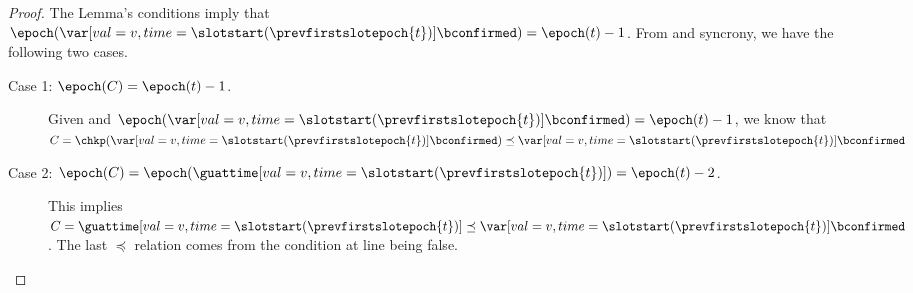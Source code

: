 \documentclass{article}
\begin{document}
\begin{proof}
    The Lemma's conditions imply that $\epoch(\var[val=v,time=\slotstart(\prevfirstslotepoch{t})]{\bconfirmed}) = \epoch(t)-1$.
    From  and syncrony, we have the following two cases.
    \begin{description}
        \item[Case 1: {$\epoch(C)=\epoch(t)-1$}.] 
        Given  and $\epoch(\var[val=v,time=\slotstart(\prevfirstslotepoch{t})]{\bconfirmed}) = \epoch(t)-1$, we know that $C  = \chkp(\var[val=v,time=\slotstart(\prevfirstslotepoch{t})]{\bconfirmed}) \preceq \var[val=v,time=\slotstart(\prevfirstslotepoch{t})]{\bconfirmed}$
        \item[Case 2: {$\epoch(C)=\epoch(\guattime[val=v,time=\slotstart(\prevfirstslotepoch{t})] )=\epoch(t)-2$}.]
        This implies $C = \guattime[val=v,time=\slotstart(\prevfirstslotepoch{t})] \preceq \var[val=v,time=\slotstart(\prevfirstslotepoch{t})]{\bconfirmed}$.
        The last $\preceq$ relation comes from the  condition at line  being false.
    \end{description}
\end{proof}

\end{document}
